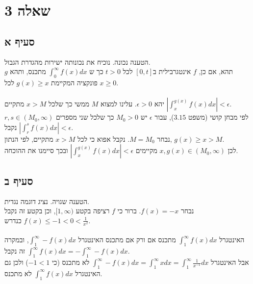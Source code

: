 \documentclass{article}
\begin{document}
\section*{שאלה 3}

\subsection*{סעיף א}

הטענה נכונה. נוכיח את נכונותה ישירות מהגדרת הגבול. \\
תהא, אם כן, $f$
אינטגרבילית ב$[0,t]$
לכל $t>0$
כך ש $\int_0^\infty f(x)dx$ מתכנס,
ותהא $g$ פונקציה המקיימת $g(x)\geq x$ לכל $x\geq 0$.
\\\\
יהא $\epsilon >0$.
עלינו למצוא $M$
ממשי כך שלכל $x>M$ מתקיים $\left| \int_x^{g(x)}f(x)dx \right| < \epsilon$. \\
לפי מבחן קושי (משפט $3.15$),
עבור $\epsilon$ יש $M_0>0$
כך שלכל שני מספרים $r,s\in(M_0, \infty)$ נקבל $\left| \int_r^sf(x)dx \right| < \epsilon$. \\
נבחר $M=M_0$. נקבל אפוא כי לכל $x>M$ מתקיים, לפי הנתון, $g(x)\geq x > M$. \\
לכן $x, g(x)\in (M_0, \infty)$ מקיימים $\left| \int_x^{g(x)}f(x)dx \right| < \epsilon$
ובכך סיימנו את ההוכחה.

\subsection*{סעיף ב}

הטענה שגויה. נציג דוגמה נגדית. \\
נבחר $f(x)=-x$. ברור כי $f$ רציפה בקטע $[1, \infty)$,
וכן בקטע זה נקבל $f(x) \leq -1 < 0 < \frac{1}{x^2}$ כנדרש.
\\\\
האינטגרל $\int_1^{\infty} f(x)dx$ מתכנס אם ורק אם מתכנס האינטגרל $\int_1^{\infty}-f(x)dx$,
ובמקרה זה נקבל $\int_1^{\infty}f(x)dx=-\int_1^{\infty}-f(x)dx$. \\
אבל האינטגרל $\int_1^{\infty}-f(x)dx=\int_1^{\infty}xdx=\int_1^{\infty} \frac{1}{x^{-1}} dx$
לא מתכנס (כי $-1<1$)
ולכן גם האינטגרל $\int_1^{\infty}f(x)dx$ לא מתכנס.
\end{document}
